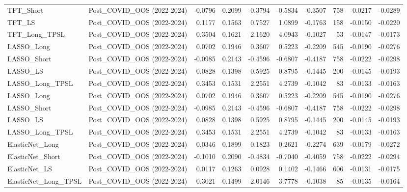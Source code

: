 \begin{tabular}{llrrrrrrrr}
\cline{1-10}
TFT\_Short & Post\_COVID\_OOS (2022-2024) & -0.0796 & 0.2099 & -0.3794 & -0.5834 & -0.3507 & 758 & -0.0217 & -0.0289 \\
\cline{1-10}
TFT\_LS & Post\_COVID\_OOS (2022-2024) & 0.1177 & 0.1563 & 0.7527 & 1.0899 & -0.1763 & 158 & -0.0150 & -0.0220 \\
\cline{1-10}
TFT\_Long\_TPSL & Post\_COVID\_OOS (2022-2024) & 0.3504 & 0.1621 & 2.1620 & 4.0943 & -0.1027 & 53 & -0.0147 & -0.0173 \\
\cline{1-10}
LASSO\_Long & Post\_COVID\_OOS (2022-2024) & 0.0702 & 0.1946 & 0.3607 & 0.5223 & -0.2209 & 545 & -0.0190 & -0.0276 \\
\cline{1-10}
LASSO\_Short & Post\_COVID\_OOS (2022-2024) & -0.0985 & 0.2143 & -0.4596 & -0.6807 & -0.4187 & 758 & -0.0222 & -0.0298 \\
\cline{1-10}
LASSO\_LS & Post\_COVID\_OOS (2022-2024) & 0.0828 & 0.1398 & 0.5925 & 0.8795 & -0.1445 & 200 & -0.0145 & -0.0193 \\
\cline{1-10}
LASSO\_Long\_TPSL & Post\_COVID\_OOS (2022-2024) & 0.3453 & 0.1531 & 2.2551 & 4.2739 & -0.1042 & 83 & -0.0133 & -0.0163 \\
\cline{1-10}
LASSO\_Long & Post\_COVID\_OOS (2022-2024) & 0.0702 & 0.1946 & 0.3607 & 0.5223 & -0.2209 & 545 & -0.0190 & -0.0276 \\
\cline{1-10}
LASSO\_Short & Post\_COVID\_OOS (2022-2024) & -0.0985 & 0.2143 & -0.4596 & -0.6807 & -0.4187 & 758 & -0.0222 & -0.0298 \\
\cline{1-10}
LASSO\_LS & Post\_COVID\_OOS (2022-2024) & 0.0828 & 0.1398 & 0.5925 & 0.8795 & -0.1445 & 200 & -0.0145 & -0.0193 \\
\cline{1-10}
LASSO\_Long\_TPSL & Post\_COVID\_OOS (2022-2024) & 0.3453 & 0.1531 & 2.2551 & 4.2739 & -0.1042 & 83 & -0.0133 & -0.0163 \\
\cline{1-10}
ElasticNet\_Long & Post\_COVID\_OOS (2022-2024) & 0.0346 & 0.1899 & 0.1823 & 0.2621 & -0.2274 & 639 & -0.0179 & -0.0272 \\
\cline{1-10}
ElasticNet\_Short & Post\_COVID\_OOS (2022-2024) & -0.1010 & 0.2090 & -0.4834 & -0.7040 & -0.4059 & 758 & -0.0222 & -0.0294 \\
\cline{1-10}
ElasticNet\_LS & Post\_COVID\_OOS (2022-2024) & 0.0117 & 0.1263 & 0.0928 & 0.1402 & -0.1466 & 606 & -0.0131 & -0.0175 \\
\cline{1-10}
ElasticNet\_Long\_TPSL & Post\_COVID\_OOS (2022-2024) & 0.3021 & 0.1499 & 2.0146 & 3.7778 & -0.1038 & 85 & -0.0135 & -0.0164 \\

\end{tabular}
